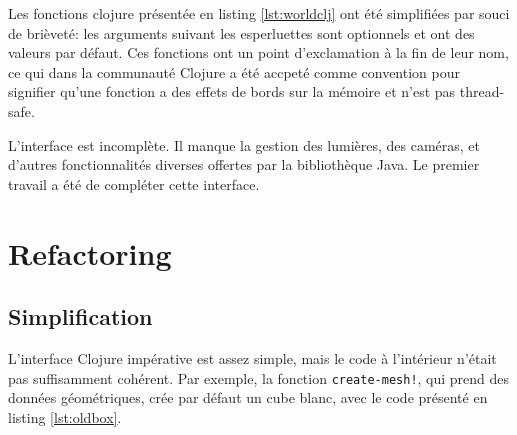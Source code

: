 \documentclass{report}
\begin{document}
Les fonctions clojure présentée en listing \ref{lst:worldclj} ont été
simplifiées par souci de brièveté: les arguments suivant les esperluettes sont
optionnels et ont des valeurs par défaut.
Ces fonctions ont un point d'exclamation à la fin de leur nom, ce qui dans la
communauté Clojure a été accpeté comme convention pour signifier qu'une fonction
a des effets de bords sur la mémoire et n'est pas \og thread-safe.\fg{}

L'interface est incomplète. Il manque la gestion des lumières, des caméras, et
d'autres fonctionnalités diverses offertes par la bibliothèque Java.
Le premier travail a été de compléter cette interface.

\section{Refactoring}
\subsection{Simplification}
L'interface Clojure impérative est assez simple, mais le code à l'intérieur
n'était pas suffisamment cohérent.
Par exemple, la fonction \lstinline|create-mesh!|, qui prend des données
géométriques, crée par défaut un cube blanc, avec le code présenté en listing
\ref{lst:oldbox}.
\end{document}
